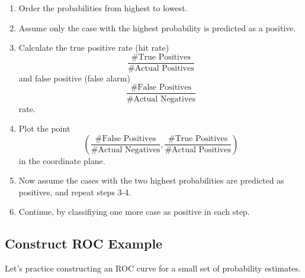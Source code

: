 \documentclass[
  letterpaper,
  DIV=11,
  numbers=noendperiod]{scrreprt}
\providecommand{\tightlist}{%
  \setlength{\itemsep}{0pt}\setlength{\parskip}{0pt}}\usepackage{longtable,booktabs,array}
\begin{document}
\begin{enumerate}
\def\labelenumi{\arabic{enumi}.}
\tightlist
\item
  Order the probabilities from highest to lowest.\\
\item
  Assume only the case with the highest probability is predicted as a
  positive.\\
\item
  Calculate the true positive rate (hit rate)
  \[\frac{\text{\# True Positives}}{\text{\# Actual Positives}}\] and
  false positive (false alarm)
  \[\frac{\text{\# False Positives}}{\text{\# Actual Negatives}}\]rate.
\item
  Plot the point
  \[\left( \frac{\text{\# False Positives}}{\text{\# Actual Negatives}}, \frac{\text{\# True Positives}}{\text{\# Actual Positives}} \right)\]
  in the coordinate plane.\\
\item
  Now assume the cases with the two highest probabilities are predicted
  as positives, and repeat steps 3-4.\\
\item
  Continue, by classifiying one more case as positive in each step.
\end{enumerate}

\subsection{Construct ROC Example}\label{construct-roc-example}

Let's practice constructing an ROC curve for a small set of probability
estimates.
\end{document}
